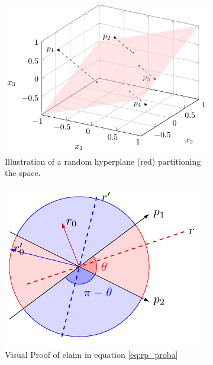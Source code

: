 \begin{figure}
    \centering
    \begin{subfigure}[b]{0.45\textwidth}
        \centering
        \includegraphics[width=\textwidth]{tikz/random_projection.pdf}
        \caption{Illustration of a random hyperplane (red) partitioning the space.}
        \label{subfig:rp_3d}
    \end{subfigure}
    \hfill
    \begin{subfigure}[b]{0.45\textwidth}
        \centering
        \includegraphics[width=\textwidth]{tikz/random_hyperplane_2d.pdf}
        \caption{Visual Proof of claim in equation \ref{eq:rp_proba}}
        \label{subfig:rp_2d}
    \end{subfigure}
    \caption{}
    \label{fig:random_projection}
\end{figure}

